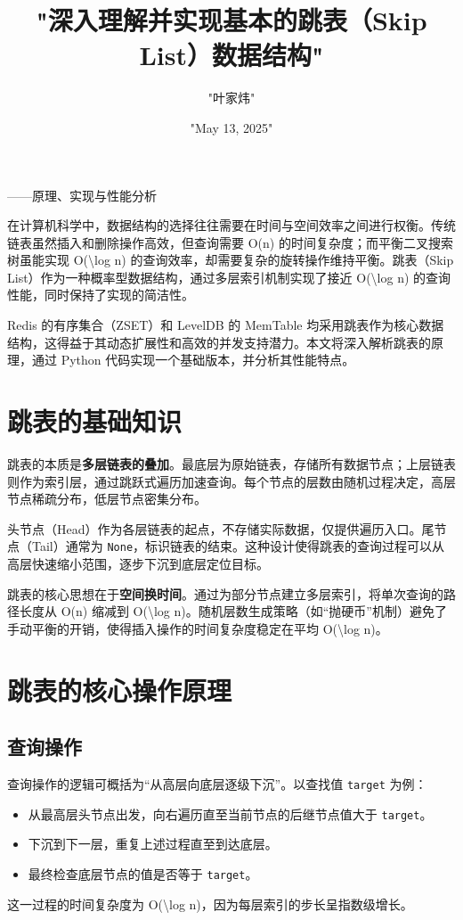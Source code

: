 \title{"深入理解并实现基本的跳表（Skip List）数据结构"}
\author{"叶家炜"}
\date{"May 13, 2025"}
\maketitle
——原理、实现与性能分析\par
在计算机科学中，数据结构的选择往往需要在时间与空间效率之间进行权衡。传统链表虽然插入和删除操作高效，但查询需要 O(n) 的时间复杂度；而平衡二叉搜索树虽能实现 O(\textbackslash{}log n) 的查询效率，却需要复杂的旋转操作维持平衡。跳表（Skip List）作为一种概率型数据结构，通过多层索引机制实现了接近 O(\textbackslash{}log n) 的查询性能，同时保持了实现的简洁性。\par
Redis 的有序集合（ZSET）和 LevelDB 的 MemTable 均采用跳表作为核心数据结构，这得益于其动态扩展性和高效的并发支持潜力。本文将深入解析跳表的原理，通过 Python 代码实现一个基础版本，并分析其性能特点。\par
\chapter{跳表的基础知识}
跳表的本质是\textbf{多层链表的叠加}。最底层为原始链表，存储所有数据节点；上层链表则作为索引层，通过跳跃式遍历加速查询。每个节点的层数由随机过程决定，高层节点稀疏分布，低层节点密集分布。\par
头节点（Head）作为各层链表的起点，不存储实际数据，仅提供遍历入口。尾节点（Tail）通常为 \texttt{None}，标识链表的结束。这种设计使得跳表的查询过程可以从高层快速缩小范围，逐步下沉到底层定位目标。\par
跳表的核心思想在于\textbf{空间换时间}。通过为部分节点建立多层索引，将单次查询的路径长度从 O(n) 缩减到 O(\textbackslash{}log n)。随机层数生成策略（如“抛硬币”机制）避免了手动平衡的开销，使得插入操作的时间复杂度稳定在平均 O(\textbackslash{}log n)。\par
\chapter{跳表的核心操作原理}
\section{查询操作}
查询操作的逻辑可概括为“从高层向底层逐级下沉”。以查找值 \texttt{target} 为例：\par
\begin{itemize}
\item 从最高层头节点出发，向右遍历直至当前节点的后继节点值大于 \texttt{target}。
\item 下沉到下一层，重复上述过程直至到达底层。
\item 最终检查底层节点的值是否等于 \texttt{target}。
\end{itemize}
这一过程的时间复杂度为 O(\textbackslash{}log n)，因为每层索引的步长呈指数级增长。\par
